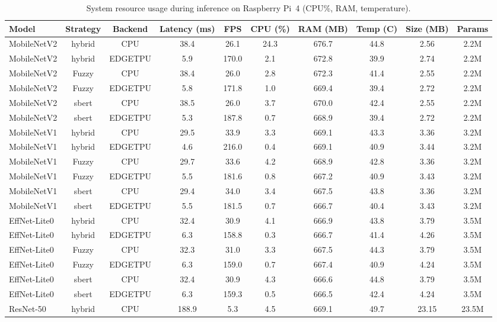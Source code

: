 \begin{table}[htbp]
\caption{System resource usage during inference on Raspberry Pi~4 (CPU\%, RAM, temperature).}
\label{tab:edge_system}
\begin{tabular}{lccccccccc}
\toprule
Model & Strategy & Backend & Latency (ms) & FPS & CPU (\%) & RAM (MB) & Temp (C) & Size (MB) & Params \\
\midrule
MobileNetV2 & hybrid & CPU & 38.4 & 26.1 & 24.3 & 676.7 & 44.8 & 2.56 & 2.2M \\
MobileNetV2 & hybrid & EDGETPU & 5.9 & 170.0 & 2.1 & 672.8 & 39.9 & 2.74 & 2.2M \\
MobileNetV2 & Fuzzy & CPU & 38.4 & 26.0 & 2.8 & 672.3 & 41.4 & 2.55 & 2.2M \\
MobileNetV2 & Fuzzy & EDGETPU & 5.8 & 171.8 & 1.0 & 669.4 & 39.4 & 2.72 & 2.2M \\
MobileNetV2 & sbert & CPU & 38.5 & 26.0 & 3.7 & 670.0 & 42.4 & 2.55 & 2.2M \\
MobileNetV2 & sbert & EDGETPU & 5.3 & 187.8 & 0.7 & 668.9 & 39.4 & 2.72 & 2.2M \\
MobileNetV1 & hybrid & CPU & 29.5 & 33.9 & 3.3 & 669.1 & 43.3 & 3.36 & 3.2M \\
MobileNetV1 & hybrid & EDGETPU & 4.6 & 216.0 & 0.4 & 669.1 & 40.9 & 3.44 & 3.2M \\
MobileNetV1 & Fuzzy & CPU & 29.7 & 33.6 & 4.2 & 668.9 & 42.8 & 3.36 & 3.2M \\
MobileNetV1 & Fuzzy & EDGETPU & 5.5 & 181.6 & 0.8 & 667.2 & 40.9 & 3.43 & 3.2M \\
MobileNetV1 & sbert & CPU & 29.4 & 34.0 & 3.4 & 667.5 & 43.8 & 3.36 & 3.2M \\
MobileNetV1 & sbert & EDGETPU & 5.5 & 181.5 & 0.7 & 666.7 & 40.4 & 3.43 & 3.2M \\
EffNet-Lite0 & hybrid & CPU & 32.4 & 30.9 & 4.1 & 666.9 & 43.8 & 3.79 & 3.5M \\
EffNet-Lite0 & hybrid & EDGETPU & 6.3 & 158.8 & 0.3 & 666.7 & 41.4 & 4.26 & 3.5M \\
EffNet-Lite0 & Fuzzy & CPU & 32.3 & 31.0 & 3.3 & 667.5 & 44.3 & 3.79 & 3.5M \\
EffNet-Lite0 & Fuzzy & EDGETPU & 6.3 & 159.0 & 0.7 & 667.4 & 40.9 & 4.24 & 3.5M \\
EffNet-Lite0 & sbert & CPU & 32.4 & 30.9 & 4.3 & 666.6 & 44.8 & 3.79 & 3.5M \\
EffNet-Lite0 & sbert & EDGETPU & 6.3 & 159.3 & 0.5 & 666.5 & 42.4 & 4.24 & 3.5M \\
ResNet-50 & hybrid & CPU & 188.9 & 5.3 & 4.5 & 669.1 & 49.7 & 23.15 & 23.5M \\

\end{tabular}
\end{table}
